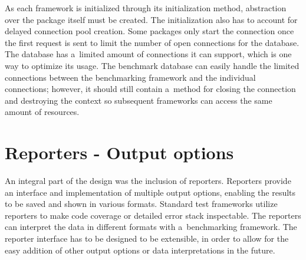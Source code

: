 As each framework is initialized through its initialization method, abstraction
over the package itself must be created. The initialization also has to account
for delayed connection pool creation. Some packages only start the connection
once the first request is sent to limit the number of open connections for the
database. The database has a~limited amount of connections it can support, which
is one way to optimize its usage. The benchmark database can easily handle the
limited connections between the benchmarking framework and the individual
connections; however, it should still contain a~method for closing the
connection and destroying the context so subsequent frameworks can access the
same amount of resources.

\section{Reporters - Output options}

An integral part of the design was the inclusion of reporters. Reporters provide
an interface and implementation of multiple output options, enabling the results
to be saved and shown in various formats. Standard test frameworks utilize
reporters to make code coverage or detailed error stack inspectable. The
reporters can interpret the data in different formats with a~benchmarking
framework. The reporter interface has to be designed to be extensible, in order
to allow for the easy addition of other output options or data interpretations
in the future.
